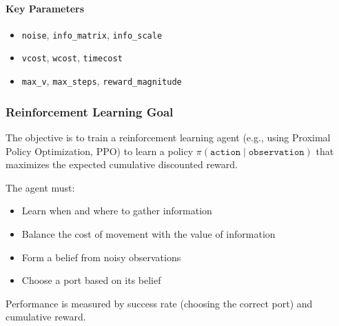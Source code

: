 \paragraph*{Key Parameters}
\begin{itemize}
    \item \texttt{noise}, \texttt{info\_matrix}, \texttt{info\_scale}
    \item \texttt{vcost}, \texttt{wcost}, \texttt{timecost}
    \item \texttt{max\_v}, \texttt{max\_steps}, \texttt{reward\_magnitude}
\end{itemize}

\subsubsection*{Reinforcement Learning Goal}

The objective is to train a reinforcement learning agent (e.g., using Proximal Policy Optimization, PPO) to learn a policy $\pi(\texttt{action} \mid \texttt{observation})$ that maximizes the expected cumulative discounted reward.

The agent must:
\begin{itemize}
    \item Learn when and where to gather information
    \item Balance the cost of movement with the value of information
    \item Form a belief from noisy observations
    \item Choose a port based on its belief
\end{itemize}

Performance is measured by success rate (choosing the correct port) and cumulative reward.
